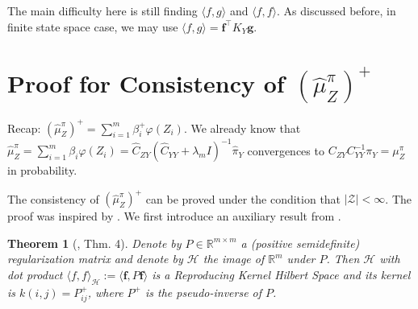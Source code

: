 \documentclass[a4paper]{article}
\renewcommand{\bf}{\mathbf}
\renewcommand{\cal}{\mathcal}
\newcommand{\bb}{\mathbb}
\newcommand{\T}{\intercal}
\newtheorem{theorem}{Theorem}
\begin{document}
The main difficulty here is still finding $\langle f,g\rangle$ and $\langle f,f\rangle$. As discussed before, in finite state space case, we may use $\langle f,g\rangle = \bf{f}^\T K_Y \bf{g}$.
\section{Proof for Consistency of $(\widehat{\mu}_Z^{\pi})^+$}
Recap: $(\widehat{\mu}_Z^{\pi})^+ = \sum_{i=1}^m \beta_i^+\varphi(Z_i) $. We already know that $\widehat{\mu}_Z^\pi = \sum_{i=1}^m \beta_i \varphi(Z_i) = \widehat{C}_{ZY}(\widehat{C}_{YY}+\lambda_m I)^{-1} \widehat{\pi}_Y$ convergences to $C_{ZY}C_{YY}^{-1}\pi_Y = \mu_Z^\pi$ in probability.

The consistency of $(\widehat{\mu}_Z^\pi)^+$ can be proved under the condition that $|\cal{Z}| < \infty$. The proof was inspired by \cite{grunewalder2012modelling}. We first introduce an auxiliary result from \cite{smola2003kernels}.
\begin{theorem}[\cite{smola2003kernels}, Thm. 4]\label{thm:smola}
Denote by $P\in \mathbb{R}^{m\times m}$ a (positive semidefinite) regularization matrix and denote by $\mathcal{H}$ the image of $\bb{R} ^m$ under $P$. Then $\mathcal{H}$ with dot product $\langle f, f\rangle_{\cal{H}} := \langle \bf{f}, P\bf{f}\rangle$ is a Reproducing Kernel Hilbert Space and its kernel is $k(i,j) = P^+_{ij}$, where $P^+$ is the pseudo-inverse of $P$.
\end{theorem}
\end{document}
